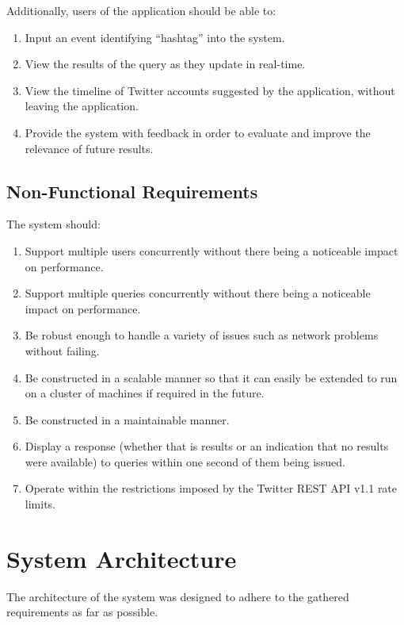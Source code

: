 \documentclass{l4proj}
\begin{document}
    Additionally, users of the application should be able to:
    \begin{enumerate}
    \item Input an event identifying ``hashtag'' into the system.
    \item View the results of the query as they update in real-time.
    \item View the timeline of Twitter accounts suggested by the application, without leaving the application.
    \item Provide the system with feedback in order to evaluate and improve the relevance of future results.

    \end{enumerate}

    \section{Non-Functional Requirements}
    
    The system should:
    
    \begin{enumerate}
    \item Support multiple users concurrently without there being a noticeable impact on performance.
    \item Support multiple queries concurrently without there being a noticeable impact on performance.
    \item Be robust enough to handle a variety of issues such as network problems without failing.
    \item Be constructed in a scalable manner so that it can easily be extended to run on a cluster of machines if required in the future.
    \item Be constructed in a maintainable manner.
    \item Display a response (whether that is results or an indication that no results were available) to queries within one second of them being issued.
    \item Operate within the restrictions imposed by the Twitter REST API v1.1 rate limits.

    \end{enumerate}

    

\chapter{System Architecture}

The architecture of the system was designed to adhere to the gathered requirements as far as possible. 
\end{document}
